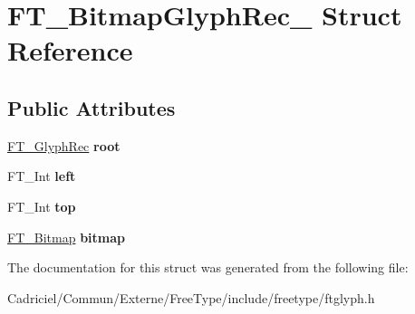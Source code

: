 \hypertarget{struct_f_t___bitmap_glyph_rec__}{}\section{F\+T\+\_\+\+Bitmap\+Glyph\+Rec\+\_\+ Struct Reference}
\label{struct_f_t___bitmap_glyph_rec__}
\subsection*{Public Attributes}
\begin{DoxyCompactItemize}
\item 
\hyperlink{struct_f_t___glyph_rec__}{F\+T\+\_\+\+Glyph\+Rec} {\bfseries root}\hypertarget{struct_f_t___bitmap_glyph_rec___ac3970353fbc0fe3d4c59c3fd608140f3}{}\label{struct_f_t___bitmap_glyph_rec___ac3970353fbc0fe3d4c59c3fd608140f3}

\item 
F\+T\+\_\+\+Int {\bfseries left}\hypertarget{struct_f_t___bitmap_glyph_rec___a6cfd2d89af7b6be4af886047c9cb7e0a}{}\label{struct_f_t___bitmap_glyph_rec___a6cfd2d89af7b6be4af886047c9cb7e0a}

\item 
F\+T\+\_\+\+Int {\bfseries top}\hypertarget{struct_f_t___bitmap_glyph_rec___a25fc81296678d6a2d064843c01bc05f7}{}\label{struct_f_t___bitmap_glyph_rec___a25fc81296678d6a2d064843c01bc05f7}

\item 
\hyperlink{struct_f_t___bitmap__}{F\+T\+\_\+\+Bitmap} {\bfseries bitmap}\hypertarget{struct_f_t___bitmap_glyph_rec___a16ecd0725920f8d5ad4c14e9448126ad}{}\label{struct_f_t___bitmap_glyph_rec___a16ecd0725920f8d5ad4c14e9448126ad}

\end{DoxyCompactItemize}


The documentation for this struct was generated from the following file\+:\begin{DoxyCompactItemize}
\item 
Cadriciel/\+Commun/\+Externe/\+Free\+Type/include/freetype/ftglyph.\+h\end{DoxyCompactItemize}
